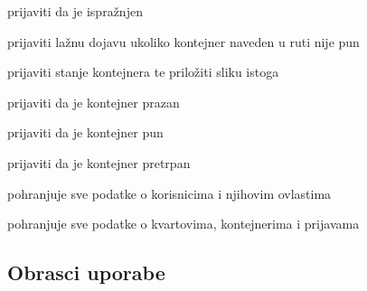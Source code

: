 \begin{packed_enum}
\begin{packed_enum}
						\begin{packed_enum}
						
						\item  prijaviti da je ispražnjen
						\item  prijaviti lažnu dojavu ukoliko kontejner naveden u ruti nije pun
				
					\end{packed_enum}
					
					\item prijaviti stanje kontejnera te priložiti sliku istoga
					\begin{packed_enum}
					
						\item prijaviti da je kontejner prazan
						\item prijaviti da je kontejner pun
						\item prijaviti da je kontejner pretrpan
						
					\end {packed_enum}	
					
										
				\end{packed_enum}
				
				
				\item  {}
				
				
				
				\begin{packed_enum}
				
					\item pohranjuje sve podatke o korisnicima i njihovim ovlastima
				
					\item pohranjuje sve podatke o kvartovima, kontejnerima i prijavama
					
						
				
				\end {packed_enum}	

				

				
			\end{packed_enum}
			
			\eject 
			
			
				
			\subsection{Obrasci uporabe}
				
			
					

